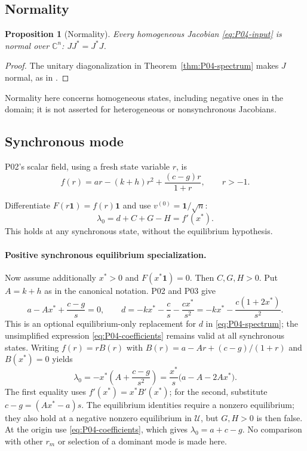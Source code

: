 \documentclass[11pt]{article}
\newcommand{\C}{\mathbb{C}}
\newcommand{\one}{\mathbf{1}}
\newcommand{\Domain}{\mathcal{U}}
\newtheorem{proposition}[theorem]{Proposition}
\theoremstyle{definition}
\theoremstyle{remark}
\begin{document}
\subsection{Normality}
\label{slot:P04-2}

\begin{proposition}[Normality]
\label{prop:P04-normality}
Every homogeneous Jacobian \eqref{eq:P04-input} is normal over
$\C^n$: $JJ^*=J^*J$.
\end{proposition}
\begin{proof}
The unitary diagonalization in Theorem~\ref{thm:P04-spectrum}
makes $J$ normal, as in \cite[\S3.1]{Gray2006}.
\end{proof}

Normality here concerns homogeneous states, including negative ones in the domain; it is not asserted for heterogeneous or nonsynchronous Jacobians.

\subsection{Synchronous mode}

P02's scalar field, using a fresh state variable $r$, is
\[
 f(r)=ar-(k+h)r^2+\frac{(c-g)r}{1+r},\qquad r>-1.
\]

Differentiate $F(r\one)=f(r)\one$ and use $v^{(0)}=\one/\sqrt n$:
\begin{equation}
 \boxed{\lambda_0=d+C+G-H=f'(x^*).}
 \label{eq:P04-synchronous-derivative}
\end{equation}
This holds at any synchronous state, without the equilibrium hypothesis.

\paragraph{Positive synchronous equilibrium specialization.}
Now assume additionally $x^*>0$ and $F(x^*\one)=0$.
Then $C,G,H>0$. Put $A=k+h$ as in the canonical notation.
P02 and P03 give
\[
 a-Ax^*+\frac{c-g}{s}=0,\qquad
 d=-kx^*-\frac{c}{s}-\frac{cx^*}{s^2}
   =-kx^*-\frac{c(1+2x^*)}{s^2}.
\]
This is an optional equilibrium-only replacement for $d$ in
\eqref{eq:P04-spectrum}; the unsimplified expression
\eqref{eq:P04-coefficients} remains valid at all synchronous states.
Writing $f(r)=rB(r)$ with
$B(r)=a-Ar+(c-g)/(1+r)$ and $B(x^*)=0$ yields
\begin{equation}
 \boxed{\lambda_0=-x^*\left(A+\frac{c-g}{s^2}\right)
          =\frac{x^*}{s}\bigl(a-A-2Ax^*\bigr).}
 \label{eq:P04-equilibrium-zero-mode}
\end{equation}
The first equality uses $f'(x^*)=x^*B'(x^*)$; for the second,
substitute $c-g=(Ax^*-a)s$.
The equilibrium identities require a nonzero equilibrium; they also
hold at a negative nonzero equilibrium in $\Domain$, but $G,H>0$
is then false. At the origin use \eqref{eq:P04-coefficients}, which
gives $\lambda_0=a+c-g$. No comparison with other $r_m$ or selection
of a dominant mode is made here.
\end{document}
